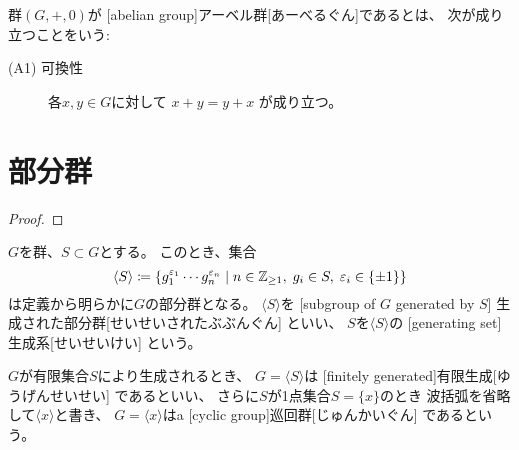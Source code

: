 \documentclass[report]{jlreq}
\begin{document}
\begin{definition}[アーベル群]
    群$(G, +, 0)$が
    [abelian group]{アーベル群}[あーべるぐん]であるとは、
    次が成り立つことをいう:
    \begin{description}
        \item[(A1) 可換性]
            各$x, y \in G$に対して
            $x + y = y + x$
            が成り立つ。
    \end{description}
\end{definition}

\begin{definition}[群準同型]
    \TODO{}
\end{definition}



%
\section{部分群}

\begin{proposition}[部分群の特徴付け]
    \TODO{}
\end{proposition}

\begin{proof}
    \TODO{}
\end{proof}

\begin{definition}[生成された部分群]
    $G$を群、$S \subset G$とする。
    このとき、集合
    \begin{equation}
        \langle S \rangle
            \coloneqq \{
                g_1^{\varepsilon_1} \cdots g_n^{\varepsilon_n}
                \mid
                n \in \mathbb{Z}_{\ge 1}, \;
                g_i \in S, \;
                \varepsilon_i \in \{ \pm 1 \}
            \}
    \end{equation}
    は定義から明らかに$G$の部分群となる。
    $\langle S \rangle$を
    [subgroup of $G$ generated by $S$]
        {生成された部分群}[せいせいされたぶぶんぐん]
    といい、
    $S$を$\langle S \rangle$の
    [generating set]{生成系}[せいせいけい]
    という。

    $G$が有限集合$S$により生成されるとき、
    $G = \langle S \rangle$は
    [finitely generated]{有限生成}[ゆうげんせいせい]
    であるといい、
    さらに$S$が1点集合$S = \{ x \}$のとき
    波括弧を省略して$\langle x \rangle$と書き、
    $G = \langle x \rangle$はa
    [cyclic group]{巡回群}[じゅんかいぐん]
    であるという。
\end{definition}
\end{document}
